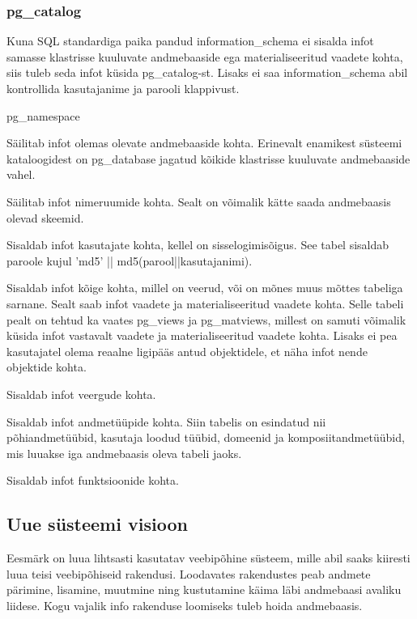 \documentclass[a4paper,12pt]{article} %
\begin{document}
\subsubsection{pg\_catalog}
Kuna SQL standardiga paika pandud information\_schema ei sisalda infot samasse klastrisse kuuluvate andmebaaside ega materialiseeritud vaadete kohta, siis tuleb seda infot küsida pg\_catalog-st. Lisaks ei saa information\_schema abil kontrollida kasutajanime ja parooli klappivust.
\begin{labeling}{pg\_namespace}
\item [pg\_database] Säilitab infot olemas olevate andmebaaside kohta. Erinevalt enamikest süsteemi kataloogidest on pg\_database jagatud kõikide klastrisse kuuluvate andmebaaside vahel.
\item [pg\_namespace] Säilitab infot nimeruumide kohta. Sealt on võimalik kätte saada andmebaasis olevad skeemid.
\item [pg\_shadow] Sisaldab infot kasutajate kohta, kellel on sisselogimisõigus. See tabel sisaldab paroole kujul 'md5' || md5(parool||kasutajanimi).
\item [pg\_class] Sisaldab infot kõige kohta, millel on veerud, või on mõnes muus mõttes tabeliga sarnane. Sealt saab infot vaadete ja materialiseeritud vaadete kohta. Selle tabeli pealt on tehtud ka vaates pg\_views ja pg\_matviews, millest on samuti võimalik küsida infot vastavalt vaadete ja materialiseeritud vaadete kohta. Lisaks ei pea kasutajatel olema reaalne ligipääs antud objektidele, et näha infot nende objektide kohta.
\item [pg\_attribute] Sisaldab infot veergude kohta.
\item [pg\_type] Sisaldab infot andmetüüpide kohta. Siin tabelis on esindatud nii põhiandmetüübid, kasutaja loodud tüübid, domeenid ja komposiitandmetüübid, mis luuakse iga andmebaasis oleva tabeli jaoks.
\item [pg\_proc] Sisaldab infot funktsioonide kohta.
\end{labeling}
\cite{PostgreSQLSystemCatalogs}

\subsection{Uue süsteemi visioon}
Eesmärk on luua lihtsasti kasutatav veebipõhine süsteem, mille abil saaks kiiresti luua teisi veebipõhiseid rakendusi. Loodavates rakendustes peab andmete pärimine, lisamine, muutmine ning kustutamine käima läbi andmebaasi avaliku liidese. Kogu vajalik info rakenduse loomiseks tuleb hoida andmebaasis.
\end{document}

